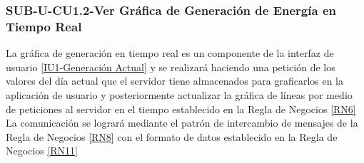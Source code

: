 \subsubsection{SUB-U-CU1.2-Ver Gráfica de Generación de Energía en Tiempo Real}\label{SUB-U-CU1.2}
La gráfica de generación en tiempo real es un componente de la interfaz de usuario \hyperref[fig:monitoreo]{[IU1-Generación Actual]} y se realizará haciendo una petición de los valores del día actual que el servidor tiene almacenados para graficarlos en la aplicación de usuario y posteriormente actualizar la gráfica de líneas por medio de peticiones al servidor en el tiempo establecido en la Regla de Negocios \ref{RN6}
\\ La comunicación se logrará mediante el patrón de intercambio de mensajes de la Regla de Negocios \ref{RN8} con el formato de datos establecido en la Regla de Negocios \ref{RN11}  

